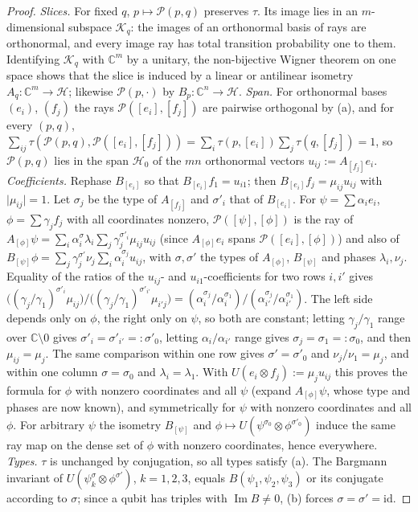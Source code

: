 \documentclass[aps,pra,onecolumn,superscriptaddress,nofootinbib,10pt]{revtex4-2}
\theoremstyle{definition}
\theoremstyle{remark}
\newcommand{\C}{\mathbb{C}}
\newcommand{\im}{\operatorname{Im}}
\begin{document}
\begin{proof}
\emph{Slices.}  For fixed $q$, $p\mapsto \mathcal P(p,q)$ preserves $\tau$.  Its image lies in an $m$-dimensional
subspace $\mathcal K_q$: the images of an orthonormal basis of rays are orthonormal, and every image ray has
total transition probability one to them.  Identifying $\mathcal K_q$ with $\C^m$ by a unitary, the
non-bijective Wigner theorem on one space \cite{Geher} shows that the slice is induced by a linear or
antilinear isometry $A_q\colon\C^m\to\mathcal H$; likewise $\mathcal P(p,\cdot)$ by $B_p\colon\C^n\to\mathcal H$.
\emph{Span.}  For orthonormal bases $(e_i)$, $(f_j)$ the rays $\mathcal P([e_i],[f_j])$ are pairwise orthogonal by
(a), and for every $(p,q)$, $\sum_{ij}\tau(\mathcal P(p,q),\mathcal P([e_i],[f_j]))=\sum_i\tau(p,[e_i])\sum_j\tau(q,[f_j])=1$, so
$\mathcal P(p,q)$ lies in the span $\mathcal H_0$ of the $mn$ orthonormal vectors $u_{ij}:=A_{[f_j]}e_i$.
\emph{Coefficients.}  Rephase $B_{[e_i]}$ so that $B_{[e_i]}f_1=u_{i1}$; then $B_{[e_i]}f_j=\mu_{ij}u_{ij}$ with
$\lvert\mu_{ij}\rvert=1$.  Let $\sigma_j$ be the type of $A_{[f_j]}$ and $\sigma'_i$ that of $B_{[e_i]}$.  For
$\psi=\sum\alpha_ie_i$, $\phi=\sum\gamma_jf_j$ with all coordinates nonzero, $\mathcal P([\psi],[\phi])$ is the ray of
$A_{[\phi]}\psi=\sum_i\alpha_i^{\sigma}\lambda_i\sum_j\gamma_j^{\sigma'_i}\mu_{ij}u_{ij}$ (since $A_{[\phi]}e_i$ spans
$\mathcal P([e_i],[\phi])$) and also of $B_{[\psi]}\phi=\sum_j\gamma_j^{\sigma'}\nu_j\sum_i\alpha_i^{\sigma_j}u_{ij}$, with $\sigma,\sigma'$
the types of $A_{[\phi]}$, $B_{[\psi]}$ and phases $\lambda_i,\nu_j$.  Equality of the ratios of the
$u_{ij}$- and $u_{i1}$-coefficients for two rows $i,i'$ gives
$\bigl((\gamma_j/\gamma_1)^{\sigma'_i}\mu_{ij}\bigr)/\bigl((\gamma_j/\gamma_1)^{\sigma'_{i'}}\mu_{i'j}\bigr)
=(\alpha_i^{\sigma_j}/\alpha_i^{\sigma_1})/(\alpha_{i'}^{\sigma_j}/\alpha_{i'}^{\sigma_1})$.  The left side depends only on $\phi$,
the right only on $\psi$, so both are constant; letting $\gamma_j/\gamma_1$ range over $\C\setminus0$ gives
$\sigma'_i=\sigma'_{i'}=:\sigma'_0$, letting $\alpha_i/\alpha_{i'}$ range gives $\sigma_j=\sigma_1=:\sigma_0$, and then $\mu_{ij}=\mu_j$.  The
same comparison within one row gives $\sigma'=\sigma'_0$ and $\nu_j/\nu_1=\mu_j$, and within one column $\sigma=\sigma_0$ and
$\lambda_i=\lambda_1$.  With $U(e_i\otimes f_j):=\mu_ju_{ij}$ this proves the formula for $\phi$ with nonzero
coordinates and all $\psi$ (expand $A_{[\phi]}\psi$, whose type and phases are now known), and
symmetrically for $\psi$ with nonzero coordinates and all $\phi$.  For arbitrary $\psi$ the isometry
$B_{[\psi]}$ and $\phi\mapsto U(\psi^{\sigma_0}\otimes\phi^{\sigma'_0})$ induce the same ray map on the dense set of
$\phi$ with nonzero coordinates, hence everywhere.
\emph{Types.}  $\tau$ is unchanged by conjugation, so all types satisfy (a).  The Bargmann invariant of
$U(\psi_k^\sigma\otimes\phi^{\sigma'})$, $k=1,2,3$, equals $B(\psi_1,\psi_2,\psi_3)$ or its conjugate according to $\sigma$;
since a qubit has triples with $\im B\ne0$, (b) forces $\sigma=\sigma'=\mathrm{id}$.
\end{proof}
\end{document}
